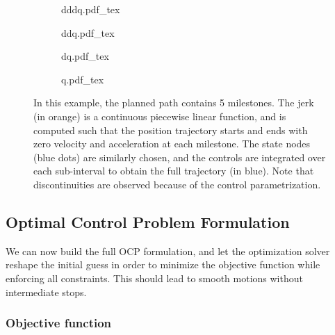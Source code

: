 \begin{figure}
  \centering
  \begin{subfigure}{0.5\columnwidth}
    \centering
        {\def\svgwidth{\linewidth}
          {\tiny
            
                       {dddq.pdf_tex}
          }
        }
  \end{subfigure}
  \begin{subfigure}{0.49\columnwidth}
    \centering
        {\def\svgwidth{\linewidth}
          {\tiny
            
                       {ddq.pdf_tex}
          }
        }
  \end{subfigure}
  \begin{subfigure}{0.49\columnwidth}
    \centering
        {\def\svgwidth{\linewidth}
          {\tiny
            
                       {dq.pdf_tex}
          }
        }
  \end{subfigure}
  \begin{subfigure}{0.5\columnwidth}
    \centering
        {\def\svgwidth{\linewidth}
          {\tiny
            
                       {q.pdf_tex}
          }
        }
  \end{subfigure}
  \caption{In this example, the planned path contains 5
    milestones. The jerk (in orange) is a continuous piecewise linear
    function, and is computed such that the position trajectory starts
    and ends with zero velocity and acceleration at each
    milestone. The state nodes (blue dots) are similarly chosen, and
    the controls are integrated over each sub-interval to obtain the
    full trajectory (in blue). Note that discontinuities are observed
    because of the control parametrization.}
  \label{fig:chap3-time-param}
\end{figure}

\subsection{Optimal Control Problem Formulation}
\label{subsec:chap3-ocp}

We can now build the full OCP formulation, and let the optimization
solver reshape the initial guess in order to minimize the objective
function while enforcing all constraints. This should lead to smooth
motions without intermediate stops.

\subsubsection{Objective function}

